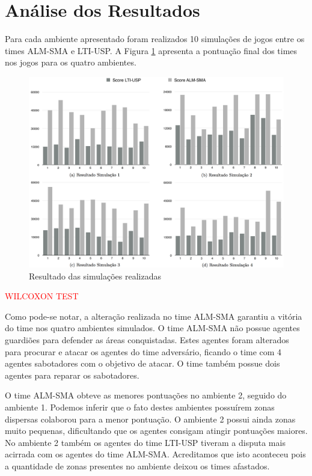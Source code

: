 \documentclass{llncs}
\begin{document}
\section{Análise dos Resultados}

Para cada ambiente apresentado foram realizados 10 simulações de jogos entre os times ALM-SMA e LTI-USP. A Figura \ref{fig:resultados} apresenta a pontuação final dos times nos jogos para os quatro ambientes.

\begin{figure}[!ht]
\centering
\includegraphics[width=1\linewidth]{./images/simulations-chart.png}
\caption{Resultado das simulações realizadas}
\label{fig:resultados}
\end{figure}

\textcolor{red}{WILCOXON TEST}

Como pode-se notar, a alteração realizada no time ALM-SMA garantiu a vitória do time nos quatro ambientes simulados. O time ALM-SMA não possue agentes guardiões para defender as áreas conquistadas. Estes agentes foram alterados para procurar e atacar os agentes do time adversário, ficando o time com 4 agentes sabotadores com o objetivo de atacar. O time também possue dois agentes para reparar os sabotadores.

O time ALM-SMA obteve as menores pontuações no ambiente 2, seguido do ambiente 1. Podemos inferir que o fato destes ambientes possuírem zonas dispersas colaborou para a menor pontuação. O ambiente 2 possui ainda zonas muito pequenas, dificultando que os agentes consigam atingir pontuações maiores. No ambiente 2 também os agentes do time LTI-USP tiveram a disputa mais acirrada com os agentes do time ALM-SMA. Acreditamos que isto aconteceu pois a quantidade de zonas presentes no ambiente deixou os times afastados.
\end{document}
